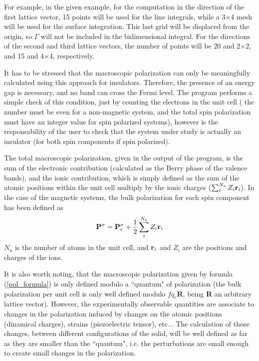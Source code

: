 \begin{description}
For example, in the given example, for the computation in the
direction of the first lattice vector, 15 points will be used
for the line integrals, while a 3$\times$4 mesh will be used
for the surface integration. This last grid will be displaced 
from the origin, so $\Gamma$ will not be included in the 
bidimensional integral. For the directions of the second
and third lattice vectors, the number of points will be
20 and 2$\times$2, and 15 and 4$\times$4, respectively. 

It has to be stressed that the macroscopic polarization can only
be meaningfully calculated using this approach for insulators. 
Therefore, the presence of an energy gap is necessary, and 
no band can cross the Fermi level. The program performs a simple
check of this 
condition, just by counting the electrons in the unit cell ( 
the number must be even for a non-magnetic system, and the
total spin polarization must have an integer value for 
spin polarized systems), however is the responsability of the 
user to check that the system under study is actually an insulator
(for both spin components if spin polarized).

The total macroscopic polarization, 
given in the output of the program,
is the sum 
of the electronic contribution (calculated as the 
Berry phase of the valence bands), and the ionic contribution, 
which is simply defined as the sum of the atomic positions within
the unit cell multiply by 
the ionic charges ($\sum_i^{N_a} Z_i {\bf r}_i$). 
In the case of the magnetic 
systems, the bulk polarization for each spin component has been 
defined as 
\begin{equation}
       {\bf P}^\sigma = {\bf P}_e^\sigma + 
   {1 \over 2} \sum_i^{N_a}  Z_i {\bf r}_i
\end{equation}
$N_a$ is the number of atoms in the unit cell, and ${\bf r}_i$ and
$Z_i$ 
are the positions and charges of the ions.

It is also worth noting, that the macroscopic polarization given 
by formula (\ref{pol_formula}) is only defined modulo a ``quantum"
of polarization (the bulk polarization per unit cell is only 
well defined modulo $fq_e${\bf R}, being {\bf R} an arbitrary lattice
vector). However, the experimentally observable quantities are
associate to changes in the polarization induced by changes on 
the atomic positions (dinamical charges), strains (piezoelectric tensor), 
etc... The calculation of those changes, 
between different configurations of the solid,
will be well defined as far as they are smaller than the ``quantum", 
i.e. the perturbations are small enough to 
create small changes in the polarization. 


\end{description}
